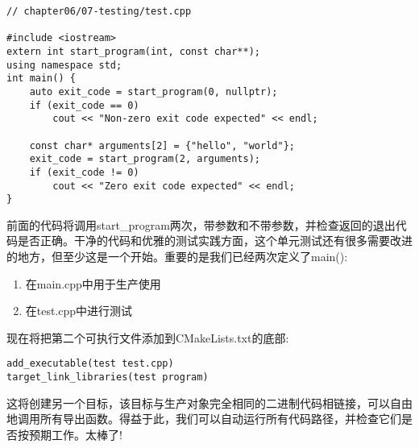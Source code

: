 \begin{lstlisting}[style=styleCXX]
// chapter06/07-testing/test.cpp

#include <iostream>
extern int start_program(int, const char**);
using namespace std;
int main() {
	auto exit_code = start_program(0, nullptr);
	if (exit_code == 0)
		cout << "Non-zero exit code expected" << endl;
	
	const char* arguments[2] = {"hello", "world"};
	exit_code = start_program(2, arguments);
	if (exit_code != 0)
		cout << "Zero exit code expected" << endl;
}
\end{lstlisting}

前面的代码将调用start\_program两次，带参数和不带参数，并检查返回的退出代码是否正确。干净的代码和优雅的测试实践方面，这个单元测试还有很多需要改进的地方，但至少这是一个开始。重要的是我们已经两次定义了main():

\begin{enumerate}
\item 
在main.cpp中用于生产使用

\item 
在test.cpp中进行测试
\end{enumerate}

现在将把第二个可执行文件添加到CMakeLists.txt的底部:

\begin{lstlisting}[style=styleCMake]
add_executable(test test.cpp)
target_link_libraries(test program)
\end{lstlisting}

这将创建另一个目标，该目标与生产对象完全相同的二进制代码相链接，可以自由地调用所有导出函数。得益于此，我们可以自动运行所有代码路径，并检查它们是否按预期工作。太棒了!













